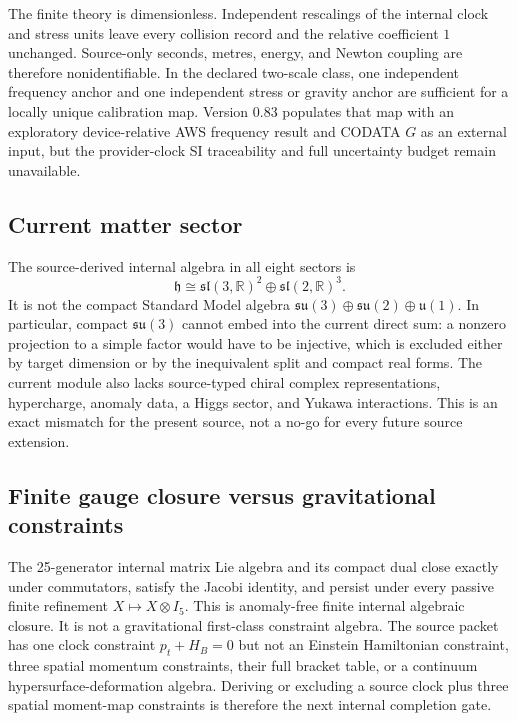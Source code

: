 \documentclass[11pt]{article}
\theoremstyle{definition}
\theoremstyle{remark}
\begin{document}
The finite theory is dimensionless. Independent rescalings of the internal clock and stress units leave every collision record and the relative coefficient $1$ unchanged. Source-only seconds, metres, energy, and Newton coupling are therefore nonidentifiable. In the declared two-scale class, one independent frequency anchor and one independent stress or gravity anchor are sufficient for a locally unique calibration map. Version 0.83 populates that map with an exploratory device-relative AWS frequency result and CODATA $G$ as an external input, but the provider-clock SI traceability and full uncertainty budget remain unavailable.

\subsection{Current matter sector}

The source-derived internal algebra in all eight sectors is
\begin{equation}
 \mathfrak h\cong
 \mathfrak{sl}(3,\mathbb R)^2\oplus
 \mathfrak{sl}(2,\mathbb R)^3.
\end{equation}
It is not the compact Standard Model algebra
$\mathfrak{su}(3)\oplus\mathfrak{su}(2)\oplus\mathfrak u(1)$. In particular, compact $\mathfrak{su}(3)$ cannot embed into the current direct sum: a nonzero projection to a simple factor would have to be injective, which is excluded either by target dimension or by the inequivalent split and compact real forms. The current module also lacks source-typed chiral complex representations, hypercharge, anomaly data, a Higgs sector, and Yukawa interactions. This is an exact mismatch for the present source, not a no-go for every future source extension.

\subsection{Finite gauge closure versus gravitational constraints}

The 25-generator internal matrix Lie algebra and its compact dual close exactly under commutators, satisfy the Jacobi identity, and persist under every passive finite refinement $X\mapsto X\otimes I_5$. This is anomaly-free finite internal algebraic closure. It is not a gravitational first-class constraint algebra. The source packet has one clock constraint $p_t+H_B=0$ but not an Einstein Hamiltonian constraint, three spatial momentum constraints, their full bracket table, or a continuum hypersurface-deformation algebra. Deriving or excluding a source clock plus three spatial moment-map constraints is therefore the next internal completion gate.
\end{document}
